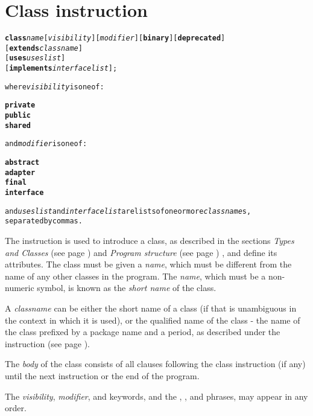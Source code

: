\chapter{Class instruction}\label{refclass}
\index{,}
\index{,}
\begin{shaded}
\begin{alltt}
\textbf{class} \emph{name} [\emph{visibility}] [\emph{modifier}] [\textbf{binary}] [\textbf{deprecated}]
               [\textbf{extends} \emph{classname}]
               [\textbf{uses} \emph{useslist}]
               [\textbf{implements} \emph{interfacelist}];

where \emph{visibility} is one of:

    \textbf{private}
    \textbf{public}
    \textbf{shared}

and \emph{modifier} is one of:

    \textbf{abstract}
    \textbf{adapter}
    \textbf{final}
    \textbf{interface}

and \emph{useslist} and \emph{interfacelist} are lists of one or more \emph{classname}s,\\ separated by commas.\end{alltt}
\end{shaded}
 The  instruction is used to introduce a class, as
described in the sections \emph{Types and Classes} (see page
  \pageref{reftypes}) and \emph{Program structure} (see page \pageref{refpstruct}) ,
and define its attributes.
The class must be given a \emph{name}, which must be different from
the name of any other classes in the program.
The \emph{name}, which must be a non-numeric symbol, is known as the
\emph{short name} of the class.
 
A \emph{classname} can be either the short name of a class (if that is
unambiguous in the context in which it is used), or the qualified name
of the class - the name of the class prefixed by a package name and
a period, as described under the   instruction (see page \pageref{refpackage}).
 
The \emph{body} of the class consists of all clauses following the
class instruction (if any) until the next  instruction or
the end of the program.
 
The \emph{visibility}, \emph{modifier}, and 
keywords, and the , , and
 phrases, may appear in any order.
